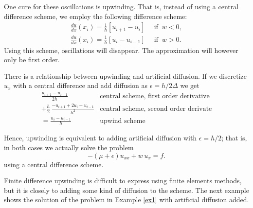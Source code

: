 One cure for these oscillations is upwinding. That is, instead
of using a central difference scheme, we employ the following difference
scheme:   
\begin{eqnarray*}
\frac{du}{dx} (x_i) = \frac{1}{h}[u_{i+1}-u_{i}] \quad   \mbox{ if } \ w < 0, \\ 
\frac{du}{dx} (x_i) = \frac{1}{h}[u_{i}-u_{i-1}] \quad  \mbox{ if } \ w > 0 .  
\end{eqnarray*}
Using this scheme, oscillations will disappear. The approximation will however only be first order.

There is a relationship between upwinding and artificial diffusion.  If we discretize $u_x$ with a central difference and add diffusion as $\epsilon =h/2 \Delta $ we get
\begin{eqnarray*}
 \frac{u_{i+1}  -  u_{i-1}}{2 h}    &  \textrm{central scheme, first order derivative}  \\
+ \frac{h}{2} \, \frac{-u_{i+1}   + 2 u_{i}    -u_{i-1}}{h^2}  &  \textrm{central scheme, second order derivate}   \\
= \frac{u_{i} -u_{i-1}}{h} &  \textrm{upwind scheme}   
\end{eqnarray*}

\noindent
Hence, upwinding is equivalent to adding artificial diffusion with $\epsilon=h/2$; that is, in both cases we actually solve the problem
\[-(\mu+\epsilon)u_{xx} + w \, u_x = f.\]
using a central difference scheme. 

Finite difference upwinding is difficult to express using finite elements methods, but
it is closely to adding some kind of diffusion to the scheme.  
The next example shows the solution of the problem in Example \ref{ex1} with 
artificial diffusion added. 

